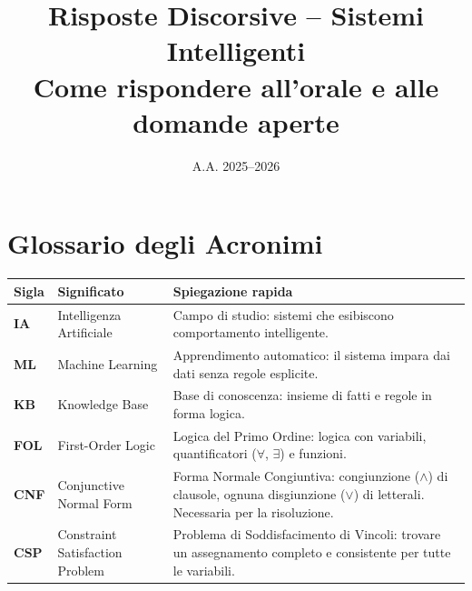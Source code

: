 \documentclass[12pt,a4paper]{article}
\title{\textbf{Risposte Discorsive -- Sistemi Intelligenti}\\[5pt]
{\large Come rispondere all'orale e alle domande aperte}}
\author{}
\date{A.A. 2025--2026}
\begin{document}
\maketitle
\tableofcontents
\newpage

\section{Glossario degli Acronimi}

{\small
\renewcommand{\arraystretch}{1.4}
\setlength{\tabcolsep}{5pt}

\begin{tcolorbox}[colback=blue!3, colframe=blue!45!black,
  title=\textbf{Generali e Logica}, fonttitle=\bfseries\small, breakable]
\begin{tabularx}{\linewidth}{@{}p{1.5cm} p{4.6cm} X@{}}
\toprule
\textbf{Sigla} & \textbf{Significato} & \textbf{Spiegazione rapida} \\
\midrule
\textbf{IA}  & Intelligenza Artificiale    & Campo di studio: sistemi che esibiscono comportamento intelligente. \\
\textbf{ML}  & Machine Learning            & Apprendimento automatico: il sistema impara dai dati senza regole esplicite. \\
\textbf{KB}  & Knowledge Base              & Base di conoscenza: insieme di fatti e regole in forma logica. \\
\textbf{FOL} & First-Order Logic           & Logica del Primo Ordine: logica con variabili, quantificatori ($\forall$, $\exists$) e funzioni. \\
\textbf{CNF} & Conjunctive Normal Form     & Forma Normale Congiuntiva: congiunzione ($\land$) di clausole, ognuna disgiunzione ($\lor$) di letterali. Necessaria per la risoluzione. \\
\textbf{CSP} & Constraint Satisfaction Problem & Problema di Soddisfacimento di Vincoli: trovare un assegnamento completo e consistente per tutte le variabili. \\
\bottomrule
\end{tabularx}
\end{tcolorbox}

\vspace{6pt}

}
\end{document}
